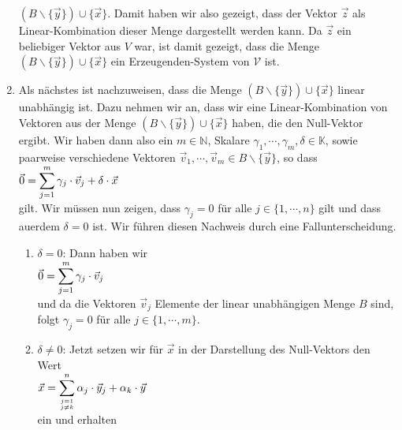 \begin{enumerate}
      $(B \backslash \{ \vec{y} \}) \cup \{ \vec{x} \}$.  Damit haben wir also gezeigt, dass der
      Vektor $\vec{z}$ als Linear-Kombination dieser Menge dargestellt werden kann.
      Da $\vec{z}$ ein beliebiger Vektor aus $V$ war, ist damit gezeigt, dass die Menge
      $(B \backslash \{ \vec{y} \}) \cup \{ \vec{x} \}$ ein Erzeugenden-System von $\mathcal{V}$ ist.
\item Als n\"{a}chstes ist nachzuweisen, dass die Menge  $(B \backslash \{ \vec{y} \}) \cup \{ \vec{x} \}$
      linear unabh\"{a}ngig ist.  Dazu nehmen wir an, dass wir eine Linear-Kombination von Vektoren aus
      der Menge $(B \backslash \{ \vec{y} \}) \cup \{ \vec{x} \}$ haben, die den Null-Vektor ergibt.
      Wir haben dann also ein $m \in \mathbb{N}$, Skalare $\gamma_1, \cdots, \gamma_m, \delta \in \mathbb{K}$,
      sowie paarweise verschiedene Vektoren $\vec{v}_1, \cdots, \vec{v}_m \in B \backslash \{ \vec{y} \}$, so dass
      \\[0.2cm]
      \hspace*{1.3cm}
      $\displaystyle\vec{0} = \sum\limits_{j=1}^m \gamma_j \cdot \vec{v}_j + \delta \cdot \vec{x}$
      \\[0.2cm]
      gilt.  Wir m\"{u}ssen nun zeigen, dass $\gamma_j = 0$ f\"{u}r alle $j \in \{1,\cdots,n\}$ gilt und dass au\3erdem 
      $\delta = 0$ ist.  Wir f\"{u}hren diesen Nachweis durch eine Fallunterscheidung.
      \begin{enumerate}
      \item $\delta = 0$:  Dann haben wir
            \\[0.2cm]
            \hspace*{1.3cm}
            $\displaystyle\vec{0} = \sum\limits_{j=1}^m \gamma_j \cdot \vec{v}_j$
            \\[0.2cm]
            und da die Vektoren $\vec{v}_j$ Elemente der linear unabh\"{a}ngigen Menge $B$ sind, folgt 
            $\gamma_j = 0$ f\"{u}r alle $j \in \{1,\cdots,m\}$.   
      \item $\delta \not= 0$:  Jetzt setzen wir f\"{u}r $\vec{x}$ in der Darstellung des Null-Vektors den Wert 
            \\[0.2cm]
            \hspace*{1.3cm}
            $\displaystyle\vec{x} = \sum\limits_{j=1 \atop j \not= k}^n \alpha_j \cdot \vec{y}_j +  \alpha_k \cdot \vec{y}$
            \\[0.2cm]
            ein und erhalten
            \\[0.2cm]
            \hspace*{1.3cm}

\end{enumerate}
\end{enumerate}
